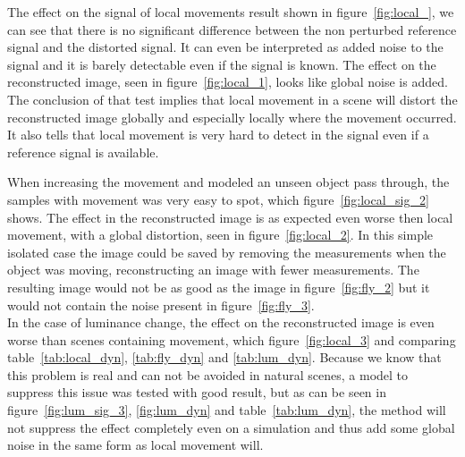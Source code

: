 The effect on the signal of local movements result shown in figure~\ref{fig:local_}, we can see that there is no significant difference between the non perturbed reference signal and the distorted signal. It can even be interpreted as added noise to the signal and it is barely detectable even if the signal is known. The effect on the reconstructed image, seen in figure~\ref{fig:local_1}, looks like global noise is added. The conclusion of that test implies that local movement in a scene will distort the reconstructed image globally and especially locally where the movement occurred. It also tells that local movement is very hard to detect in the signal even if a reference signal is available.\\[0.1in] 

When increasing the movement and modeled an unseen object pass through, the samples with movement was very easy to spot, which figure~\ref{fig:local_sig_2} shows. The effect in the reconstructed image is as expected even worse then local movement, with a global distortion, seen in figure~\ref{fig:local_2}. In this simple isolated case the image could be saved by removing the measurements when the object was moving, reconstructing an image with fewer measurements. The resulting image would not be as good as the image in figure~\ref{fig:fly_2} but it would not contain the noise present in figure~\ref{fig:fly_3}. \\[0.1in]


In the case of luminance change, the effect on the reconstructed image is even worse than scenes containing movement, which figure~\ref{fig:local_3} and comparing table~\ref{tab:local_dyn}, \ref{tab:fly_dyn} and \ref{tab:lum_dyn}. Because we know that this problem is real and can not be avoided in natural scenes, a model to suppress this issue was tested with good result, but as can be seen in figure~\ref{fig:lum_sig_3}, \ref{fig:lum_dyn} and table~\ref{tab:lum_dyn}, the method will not suppress the effect completely even on a simulation and thus add some global noise in the same form as local movement will.\\[0.1in]

